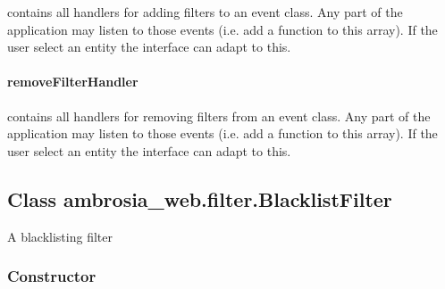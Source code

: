 \documentclass[letterpaper,10pt,english]{sphinxmanual}
\begin{document}
\begin{fulllineitems}
\label{ambrosia_web.filter:addFilterHandler}
\end{fulllineitems}


contains all handlers for adding filters to an  event class. Any part of the application may listen to those
events (i.e. add a function to this array). If the user select an entity the interface can adapt to this.


\paragraph{removeFilterHandler}
\label{ambrosia_web.filter:removefilterhandler}

\begin{fulllineitems}
\label{ambrosia_web.filter:removeFilterHandler}
\end{fulllineitems}


contains all handlers for removing filters from an  event class. Any part of the application may listen to those
events (i.e. add a function to this array). If the user select an entity the interface can adapt to this.


\subsection{Class ambrosia\_web.filter.BlacklistFilter}
\label{ambrosia_web.filter.BlacklistFilter:class-ambrosia-web-filter-blacklistfilter}\label{ambrosia_web.filter.BlacklistFilter::doc}
A blacklisting filter


\subsubsection{Constructor}
\label{ambrosia_web.filter.BlacklistFilter:constructor}
\end{document}

